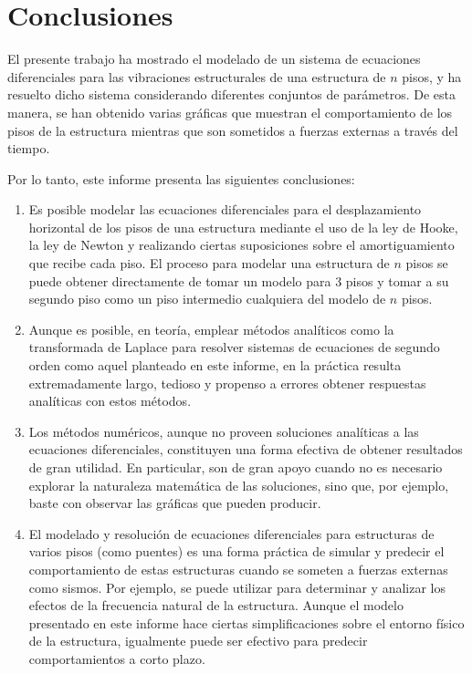 \section{Conclusiones}

El presente trabajo ha mostrado el modelado de un sistema de ecuaciones diferenciales para las vibraciones estructurales de una estructura de \(n\) pisos, y ha resuelto dicho sistema considerando diferentes conjuntos de parámetros. De esta manera, se han obtenido varias gráficas que muestran el comportamiento de los pisos de la estructura mientras que son sometidos a fuerzas externas a través del tiempo.

Por lo tanto, este informe presenta las siguientes conclusiones:

\begin{enumerate}
    \item Es posible modelar las ecuaciones diferenciales para el desplazamiento horizontal de los pisos de una estructura mediante el uso de la ley de Hooke, la ley de Newton y realizando ciertas suposiciones sobre el amortiguamiento que recibe cada piso. El proceso para modelar una estructura de \(n\) pisos se puede obtener directamente de tomar un modelo para 3 pisos y tomar a su segundo piso como un piso intermedio cualquiera del modelo de \(n\) pisos.

    \item Aunque es posible, en teoría, emplear métodos analíticos como la transformada de Laplace para resolver sistemas de ecuaciones de segundo orden como aquel planteado en este informe, en la práctica resulta extremadamente largo, tedioso y propenso a errores obtener respuestas analíticas con estos métodos.

    \item Los métodos numéricos, aunque no proveen soluciones analíticas a las ecuaciones diferenciales, constituyen una forma efectiva de obtener resultados de gran utilidad. En particular, son de gran apoyo cuando no es necesario explorar la naturaleza matemática de las soluciones, sino que, por ejemplo, baste con observar las gráficas que pueden producir.

    \item El modelado y resolución de ecuaciones diferenciales para estructuras de varios pisos (como puentes) es una forma práctica de simular y predecir el comportamiento de estas estructuras cuando se someten a fuerzas externas como sismos. Por ejemplo, se puede utilizar para determinar y analizar los efectos de la frecuencia natural de la estructura. Aunque el modelo presentado en este informe hace ciertas simplificaciones sobre el entorno físico de la estructura, igualmente puede ser efectivo para predecir comportamientos a corto plazo.
\end{enumerate}

